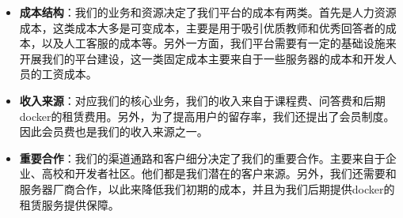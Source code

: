 \documentclass[a4paper]{ctexart}
\begin{document}
\begin{itemize}
  \item \textbf{成本结构}：我们的业务和资源决定了我们平台的成本有两类。首先是人力资源成本，这类成本大多是可变成本，主要是用于吸引优质教师和优秀回答者的成本，以及人工客服的成本等。另外一方面，我们平台需要有一定的基础设施来开展我们的平台建设，这一类固定成本主要来自于一些服务器的成本和开发人员的工资成本。
  \item \textbf{收入来源}：对应我们的核心业务，我们的收入来自于课程费、问答费和后期docker的租赁费用。另外，为了提高用户的留存率，我们还提出了会员制度。因此会员费也是我们的收入来源之一。
  \item \textbf{重要合作}：我们的渠道通路和客户细分决定了我们的重要合作。主要来自于企业、高校和开发者社区。他们都是我们潜在的客户来源。另外，我们还需要和服务器厂商合作，以此来降低我们初期的成本，并且为我们后期提供docker的租赁服务提供保障。
\end{itemize}
\end{document}
